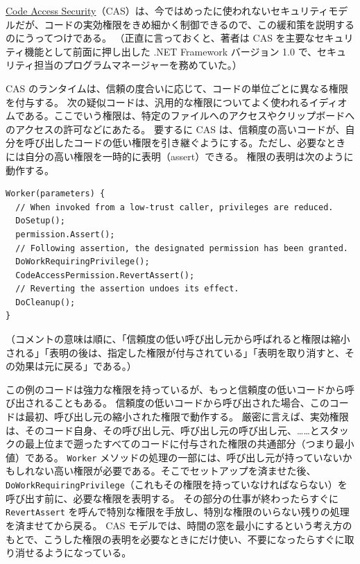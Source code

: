 \documentclass[uplatex]{jsarticle}
\def\label#1{}%
\begin{document}
\begin{exa}\label{exa:ch3-cas}
\underline{Code Access Security}（CAS）は、今ではめったに使われないセキュリティモデルだが、コードの実効権限をきめ細かく制御できるので、この緩和策を説明するのにうってつけである。
（正直に言っておくと、著者は CAS を主要なセキュリティ機能として前面に押し出した .NET Framework バージョン 1.0 で、セキュリティ担当のプログラムマネージャーを務めていた。）

CAS のランタイムは、信頼の度合いに応じて、コードの単位ごとに異なる権限を付与する。
次の疑似コードは、汎用的な権限についてよく使われるイディオムである。ここでいう権限は、特定のファイルへのアクセスやクリップボードへのアクセスの許可などにあたる。
要するに CAS は、信頼度の高いコードが、自分を呼び出したコードの低い権限を引き継ぐようにする。ただし、必要なときには自分の高い権限を一時的に表明（assert）できる。
権限の表明は次のように動作する。
\begin{verbatim}
Worker(parameters) {
  // When invoked from a low-trust caller, privileges are reduced.
  DoSetup();
  permission.Assert();
  // Following assertion, the designated permission has been granted.
  DoWorkRequiringPrivilege();
  CodeAccessPermission.RevertAssert();
  // Reverting the assertion undoes its effect.
  DoCleanup();
}
\end{verbatim}
（コメントの意味は順に、「信頼度の低い呼び出し元から呼ばれると権限は縮小される」「表明の後は、指定した権限が付与されている」「表明を取り消すと、その効果は元に戻る」である。）

この例のコードは強力な権限を持っているが、もっと信頼度の低いコードから呼び出されることもある。
信頼度の低いコードから呼び出された場合、このコードは最初、呼び出し元の縮小された権限で動作する。
厳密に言えば、実効権限は、そのコード自身、その呼び出し元、呼び出し元の呼び出し元、……とスタックの最上位まで遡ったすべてのコードに付与された権限の共通部分（つまり最小値）である。
\texttt{Worker} メソッドの処理の一部には、呼び出し元が持っていないかもしれない高い権限が必要である。そこでセットアップを済ませた後、\texttt{DoWorkRequiringPrivilege}（これもその権限を持っていなければならない）を呼び出す前に、必要な権限を表明する。
その部分の仕事が終わったらすぐに \texttt{RevertAssert} を呼んで特別な権限を手放し、特別な権限のいらない残りの処理を済ませてから戻る。
CAS モデルでは、時間の窓を最小にするという考え方のもとで、こうした権限の表明を必要なときにだけ使い、不要になったらすぐに取り消せるようになっている。
\end{exa}
\end{document}
